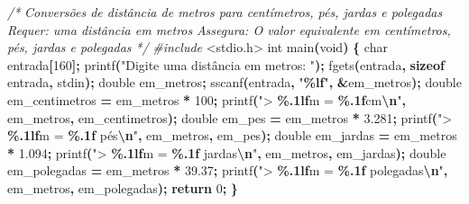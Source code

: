 \documentclass[
  11pt,
  a4paper,
]{scrbook}
\newenvironment{Shaded}{\begin{snugshade}}{\end{snugshade}}
\newcommand{\CommentTok}[1]{\textcolor[rgb]{0.56,0.35,0.01}{\textit{#1}}}
\newcommand{\ControlFlowTok}[1]{\textcolor[rgb]{0.13,0.29,0.53}{\textbf{#1}}}
\newcommand{\DataTypeTok}[1]{\textcolor[rgb]{0.13,0.29,0.53}{#1}}
\newcommand{\DecValTok}[1]{\textcolor[rgb]{0.00,0.00,0.81}{#1}}
\newcommand{\FloatTok}[1]{\textcolor[rgb]{0.00,0.00,0.81}{#1}}
\newcommand{\ImportTok}[1]{#1}
\newcommand{\KeywordTok}[1]{\textcolor[rgb]{0.13,0.29,0.53}{\textbf{#1}}}
\newcommand{\NormalTok}[1]{#1}
\newcommand{\OperatorTok}[1]{\textcolor[rgb]{0.81,0.36,0.00}{\textbf{#1}}}
\newcommand{\PreprocessorTok}[1]{\textcolor[rgb]{0.56,0.35,0.01}{\textit{#1}}}
\newcommand{\SpecialCharTok}[1]{\textcolor[rgb]{0.81,0.36,0.00}{\textbf{#1}}}
\newcommand{\StringTok}[1]{\textcolor[rgb]{0.31,0.60,0.02}{#1}}
\begin{document}
\begin{Shaded}
\begin{Highlighting}[]
\CommentTok{/*}
\CommentTok{Conversões de distância de metros para centímetros, pés, jardas e polegadas}
\CommentTok{Requer: uma distância em metros}
\CommentTok{Assegura: O valor equivalente em centímetros, pés, jardas e polegadas}
\CommentTok{*/}
\PreprocessorTok{\#include }\ImportTok{\textless{}stdio.h\textgreater{}}
\DataTypeTok{int}\NormalTok{ main}\OperatorTok{(}\DataTypeTok{void}\OperatorTok{)} \OperatorTok{\{}
    \DataTypeTok{char}\NormalTok{ entrada}\OperatorTok{[}\DecValTok{160}\OperatorTok{];}
\NormalTok{    printf}\OperatorTok{(}\StringTok{"Digite uma distância em metros: "}\OperatorTok{);}
\NormalTok{    fgets}\OperatorTok{(}\NormalTok{entrada}\OperatorTok{,} \KeywordTok{sizeof}\NormalTok{ entrada}\OperatorTok{,}\NormalTok{ stdin}\OperatorTok{);}
    \DataTypeTok{double}\NormalTok{ em\_metros}\OperatorTok{;}
\NormalTok{    sscanf}\OperatorTok{(}\NormalTok{entrada}\OperatorTok{,} \StringTok{"}\SpecialCharTok{\%lf}\StringTok{"}\OperatorTok{,} \OperatorTok{\&}\NormalTok{em\_metros}\OperatorTok{);}
    \DataTypeTok{double}\NormalTok{ em\_centimetros }\OperatorTok{=}\NormalTok{ em\_metros }\OperatorTok{*} \DecValTok{100}\OperatorTok{;}
\NormalTok{    printf}\OperatorTok{(}\StringTok{"\textgreater{} }\SpecialCharTok{\%.1lf}\StringTok{m = }\SpecialCharTok{\%.1f}\StringTok{cm}\SpecialCharTok{\textbackslash{}n}\StringTok{"}\OperatorTok{,}\NormalTok{ em\_metros}\OperatorTok{,}\NormalTok{ em\_centimetros}\OperatorTok{);}
    \DataTypeTok{double}\NormalTok{ em\_pes }\OperatorTok{=}\NormalTok{ em\_metros }\OperatorTok{*} \FloatTok{3.281}\OperatorTok{;}
\NormalTok{    printf}\OperatorTok{(}\StringTok{"\textgreater{} }\SpecialCharTok{\%.1lf}\StringTok{m = }\SpecialCharTok{\%.1f}\StringTok{ pés}\SpecialCharTok{\textbackslash{}n}\StringTok{"}\OperatorTok{,}\NormalTok{ em\_metros}\OperatorTok{,}\NormalTok{ em\_pes}\OperatorTok{);}
    \DataTypeTok{double}\NormalTok{ em\_jardas }\OperatorTok{=}\NormalTok{ em\_metros }\OperatorTok{*} \FloatTok{1.094}\OperatorTok{;}
\NormalTok{    printf}\OperatorTok{(}\StringTok{"\textgreater{} }\SpecialCharTok{\%.1lf}\StringTok{m = }\SpecialCharTok{\%.1f}\StringTok{ jardas}\SpecialCharTok{\textbackslash{}n}\StringTok{"}\OperatorTok{,}\NormalTok{ em\_metros}\OperatorTok{,}\NormalTok{ em\_jardas}\OperatorTok{);}
    \DataTypeTok{double}\NormalTok{ em\_polegadas }\OperatorTok{=}\NormalTok{ em\_metros }\OperatorTok{*} \FloatTok{39.37}\OperatorTok{;}
\NormalTok{    printf}\OperatorTok{(}\StringTok{"\textgreater{} }\SpecialCharTok{\%.1lf}\StringTok{m = }\SpecialCharTok{\%.1f}\StringTok{ polegadas}\SpecialCharTok{\textbackslash{}n}\StringTok{"}\OperatorTok{,}\NormalTok{ em\_metros}\OperatorTok{,}\NormalTok{ em\_polegadas}\OperatorTok{);}
    \ControlFlowTok{return} \DecValTok{0}\OperatorTok{;}
\OperatorTok{\}}
\end{Highlighting}
\end{Shaded}
\end{document}
